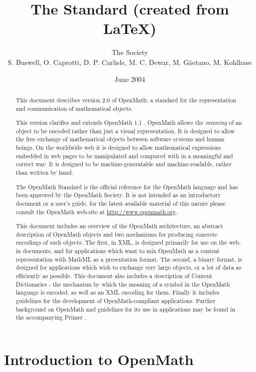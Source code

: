 \documentclass{report}
\title{The \OM2.0  Standard (created from \LaTeX)}
\author{The \OM Society \\ 
S. Buswell, 
O. Caprotti,
D. P. Carlisle,
M. C. Dewar,
M. G\"aetano,
M. Kohlhase}
\date{June 2004}
\def\OM{OpenMath\xspace}
\def\XML{XML\xspace}
\begin{document}
\maketitle


\begin{abstract}
This document describes version 2.0 of \OM: a standard for the representation and
communication of mathematical objects.

This version clarifies and extends \OM 1.1 \cite{OM_1.1}.  \OM allows the \emph{meaning}
 of an object to be encoded rather than just a visual representation.  It is designed to
 allow the free exchange of mathematical objects between software systems and human
 beings.  On the worldwide web it is designed to allow mathematical expressions embedded
 in web pages to be manipulated and computed with in a meaningful and correct way.  It is
 designed to be machine-generatable and machine-readable, rather than written by hand.

The \OM Standard is the official reference for the \OM language and has been approved by
the \OM Society.  It is not intended as an introductory document or a user's guide, for
the latest available material of this nature please consult the \OM web-site at
\url{http://www.openmath.org}.


This document includes an overview of the \OM architecture, an abstract description of \OM
objects and two mechanisms for producing concrete encodings of such objects.  The first,
in \XML, is designed primarily for use on the web, in documents, and for applications
which want to mix \OM as a content representation with MathML as a presentation format.
The second, a binary format, is designed for applications which wish to exchange very
large objects, or a lot of data as efficiently as possible.  This document also includes a
description of Content Dictionaries - the mechanism by which the meaning of a symbol in
the \OM language is encoded, as well as an XML encoding for them.  Finally it includes
guidelines for the development of \OM-compliant applications. Further background on \OM
and guidelines for its use in applications may be found in the accompanying Primer
\cite{OM_primer}.
\end{abstract}

\setcounter{tocdepth}{3}
\tableofcontents

\chapter{Introduction to \OM}\label{cha_int}
\end{document}
